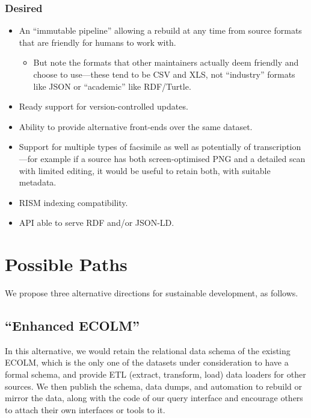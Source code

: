 \documentclass[sigconf, nonacm=true]{acmart}
\begin{document}
\begin{sloppypar}
  \subsubsection{Desired}
  
  \begin{itemize}
  \item An ``immutable pipeline'' allowing a rebuild at any time from
    source formats that are friendly for humans to work with.
    \begin{itemize}
      \item But note the formats that other maintainers actually deem
        friendly and choose to use---these tend to be CSV and XLS, not
        ``industry'' formats like JSON or ``academic'' like RDF/Turtle.
    \end{itemize}
  \item Ready support for version-controlled updates.
  \item Ability to provide alternative front-ends over the same dataset.
  \item Support for multiple types of facsimile as well as potentially
    of transcription---for example if a source has both
    screen-optimised PNG and a detailed scan with limited editing, it
    would be useful to retain both, with suitable metadata.
  \item RISM indexing compatibility.
  \item API able to serve RDF and/or JSON-LD.
  \end{itemize}
  
  \section{Possible Paths}\label{future}

  We propose three alternative directions for sustainable development,
  as follows.
  
  \subsection{``Enhanced ECOLM''}

  In this alternative, we would retain the relational data schema of
  the existing ECOLM, which is the only one of the datasets under
  consideration to have a formal schema, and provide ETL (extract,
  transform, load) data loaders for other sources. We then publish the
  schema, data dumps, and automation to rebuild or mirror the data,
  along with the code of our query interface and encourage others to
  attach their own interfaces or tools to it.


\end{sloppypar}
\end{document}
